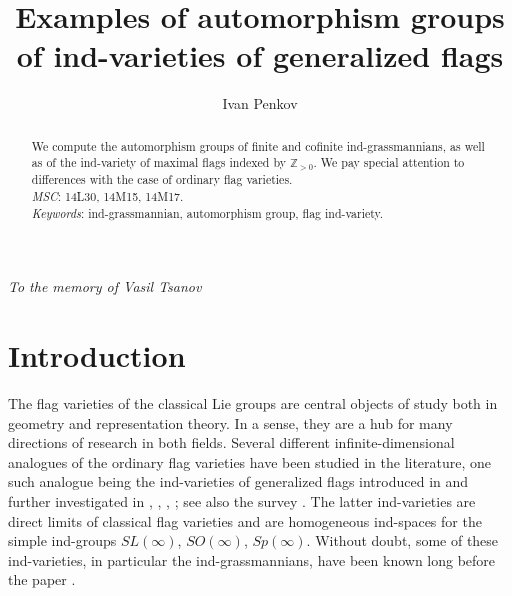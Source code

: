 \documentclass[11pt,twoside]{gsp}
\begin{document}
\thispagestyle{plain}


\title[Examples of automorphism groups of ind-varieties of generalized flags]{Examples of automorphism groups of ind-varieties of generalized flags}

\author[Ivan Penkov]{Ivan Penkov}

\date{}

\maketitle


\label{first}


\begin{center}
\it To the memory of Vasil Tsanov
\end{center}


\begin{abstract} We compute the automorphism groups of finite and cofinite ind-grassmannians, as well as of the ind-variety of maximal flags indexed by $\mathbb Z_{>0}$. We pay special attention to differences with the case of ordinary flag varieties.\\
\textsl{MSC}: 14L30, 14M15, 14M17.\\
\textsl{Keywords}: ind-grassmannian, automorphism group, flag ind-variety.
\end{abstract}








\section{Introduction}
The flag varieties of the classical Lie groups are central objects of study both in geometry and representation theory. In a sense, they are a hub for many directions of research in both fields. Several different infinite-dimensional analogues of the ordinary flag varieties have been studied in the literature, one such analogue being the ind-varieties of generalized flags introduced in \cite{DP} and further investigated in \cite{PT}, \cite{IPW}, \cite{FP1}, \cite{FP2}; see also the survey \cite{IP}. The latter ind-varieties are direct limits of classical flag varieties and are homogeneous ind-spaces for the simple ind-groups $SL(\infty)$, $SO(\infty)$, $Sp(\infty)$. Without doubt, some of these ind-varieties, in particular the ind-grassmannians, have been known long before the paper \cite{DP}. 
\end{document}
